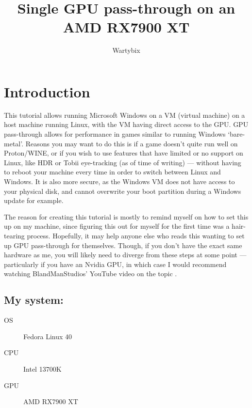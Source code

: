 \documentclass[a4paper]{article}
\author{Wartybix}
\title{Single GPU pass-through on an AMD RX7900 XT}
\begin{document}
\maketitle

\section{Introduction}

This tutorial allows running Microsoft Windows on a VM (virtual machine) on a host machine running Linux, with the VM having direct access to the GPU.
GPU pass-through allows for performance in games similar to running Windows `bare-metal'.
Reasons you may want to do this is if a game doesn't quite run well on Proton/WINE, or if you wish to use features that have limited or no support on Linux, like HDR or Tobii eye-tracking (as of time of writing) --- without having to reboot your machine every time in order to switch between Linux and Windows.
It is also more secure, as the Windows VM does not have access to your physical disk, and cannot overwrite your boot partition during a Windows update \cite{windows-overwrite-grub} for example.

The reason for creating this tutorial is mostly to remind myself on how to set this up on my machine, since figuring this out for myself for the first time was a hair-tearing process.
Hopefully, it may help anyone else who reads this wanting to set up GPU pass-through for themselves.
Though, if you don't have the exact same hardware as me, you will likely need to diverge from these steps at some point --- particularly if you have an Nvidia GPU, in which case I would recommend watching BlandManStudios' YouTube video on the topic \cite{BlandManStudios-video}.

\subsection*{My system:}
\begin{description}
    \item[OS] Fedora Linux 40
    \item[CPU] Intel 13700K
    \item[GPU] AMD RX7900 XT
\end{description}



\end{document}
